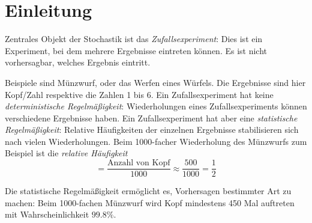 \chapter{Einleitung}

Zentrales Objekt der Stochastik ist das \emph{Zufallsexperiment}:
Dies ist ein Experiment, bei dem mehrere Ergebnisse eintreten können. Es ist nicht
vorhersagbar, welches Ergebnis eintritt.

Beispiele sind Münzwurf, oder das Werfen eines Würfels. Die Ergebnisse sind hier Kopf/Zahl
respektive die Zahlen 1 bis 6.
Ein Zufallsexperiment hat keine \emph{deterministische Regelmäßigkeit}:
Wiederholungen eines Zufallsexperiments können verschiedene Ergebnisse haben.
Ein Zufallsexperiment hat aber eine \emph{statistische Regelmäßigkeit}:
Relative Häufigkeiten der einzelnen Ergebnisse stabilisieren sich nach vielen Wiederholungen.
Beim 1000-facher Wiederholung des Münzwurfs zum Beispiel ist die \emph{relative Häufigkeit}
\begin{equation*}
    = \frac{\text{Anzahl von Kopf}}{1000} \approx \frac{500}{1000} = \frac{1}{2}
\end{equation*}

Die statistische Regelmäßigkeit ermöglicht es, Vorhersagen bestimmter Art zu machen:
Beim 1000-fachen Münzwurf wird Kopf mindestens 450 Mal auftreten mit Wahrscheinlichkeit $99.8\%$.
